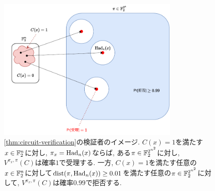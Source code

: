   \begin{figure}[htbp]
    \centering
    \includegraphics[width=0.8\textwidth]{images/circuit_verification.pdf}
    \caption{\cref{thm:circuit-verification}の検証者のイメージ. $C(x)=1$を満たす$x\in\mathbb{F}_2^n$に対し, $\pi_x=\mathrm{Had}_n(x)$ならば, ある$\pi\in \mathbb{F}_2^{2^{n^2}}$に対し, $V^{\pi_x,\pi}(C)$は確率$1$で受理する. 一方, $C(x)=1$を満たす任意の$x\in\mathbb{F}_2^n$に対して$\mathrm{dist}(\pi,\mathrm{Had}_n(x))\ge 0.01$を満たす任意の$\pi\in \mathbb{F}_2^{2^{n^2}}$に対して, $V^{\pi_x,\pi}(C)$は確率$0.99$で拒否する.}
  \end{figure}

